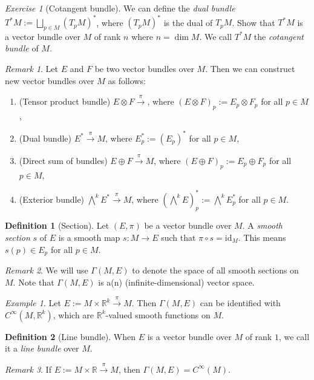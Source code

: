 \documentclass[12pt]{amsart}
\numberwithin{equation}{section}
\theoremstyle{plain}
\theoremstyle{definition}
\newtheorem{defn}{Definition}[subsection]
\theoremstyle{remark}
\newtheorem{rem}{Remark}[subsection]
\newtheorem{exe}{Exercise}[subsection]
\newtheorem{ex}{Example}[subsection]
\newcommand{\R}{\mathbb{R}}
\newcommand{\id}{\mathrm{id}}
\begin{document}
\begin{exe}[Cotangent bundle]
We can define the \emph{dual bundle} $T^*M:=\bigsqcup_{p\in M}(T_pM)^*$, where $(T_pM)^*$ is the dual of $T_pM$. Show that $T^*M$ is a vector bundle over $M$ of rank $n$ where $n=\dim M$. We call $T^*M$ the \emph{cotangent bundle} of $M$.
\end{exe}

\begin{rem}
Let $E$ and $F$ be two vector bundles over $M$. Then we can construct new vector bundles over $M$ as follows:
\begin{enumerate}
\item{(Tensor product bundle)
$E\otimes F\xrightarrow{\pi}$, where $(E\otimes F)_p:=E_p\otimes F_p$ for all $p\in M$,
}
\item{(Dual bundle)
$E^*\xrightarrow{\pi}M$, where $E_p^*:=(E_p)^*$ for all $p\in M$,
}
\item{(Direct sum of bundles)
$E\oplus F\xrightarrow{\pi}M$, where $(E\oplus F)_p:=E_p\oplus F_p$ for all $p\in M$,
}
\item{(Exterior bundle)
$\bigwedge^kE^*\xrightarrow{\pi} M$, where $(\bigwedge^kE)^*_p:=\bigwedge^k E_p^*$ for all $p\in M$.
}
\end{enumerate}
\end{rem}

\begin{defn}[Section]
Let $(E,\pi)$ be a vector bundle over $M$. A \emph{smooth section} $s$ of $E$ is a smooth map $s\colon M\to E$ such that $\pi\circ s=\id_M$. This means $s(p)\in E_p$ for all $p\in M$.
\end{defn}
\begin{rem}
We will use $\Gamma(M,E)$ to denote the space of all smooth sections on $M$. Note that $\Gamma(M,E)$ is a(n) (infinite-dimensional) vector space. 
\end{rem}

\begin{ex}
Let $E:=M\times \R^k\xrightarrow{\pi}M$. Then $\Gamma(M,E)$ can be identified with $C^\infty(M,\R^k)$, which are $\R^k$-valued smooth functions on $M$.
\end{ex}

\begin{defn}[Line bundle]
When $E$ is a vector bundle over $M$ of rank $1$, we call it a \emph{line bundle} over $M$.
\end{defn}

\begin{rem}
If $E:=M\times\R\xrightarrow{\pi}M$, then $\Gamma(M,E)=C^\infty(M)$.
\end{rem}
\end{document}
